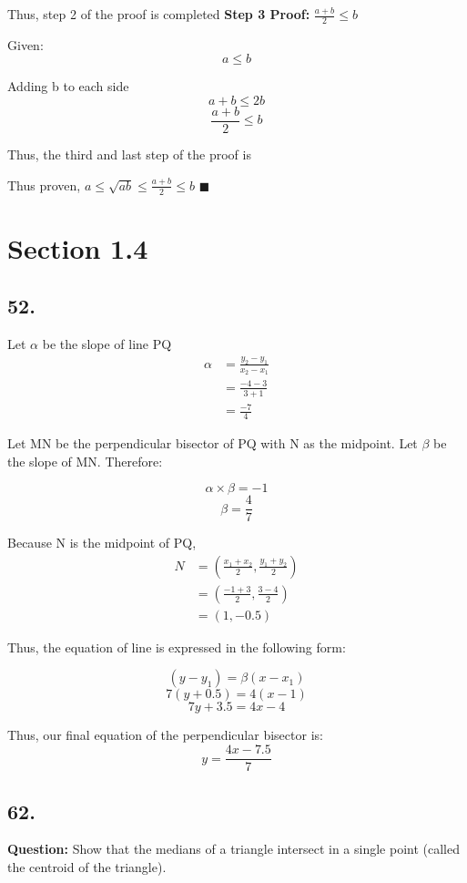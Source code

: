 \documentclass[12pt, a4paper]{article}
\newcommand{\qed}[0]{$\blacksquare$}
\begin{document}
Thus, step 2 of the proof is completed
\bigbreak
\textbf{Step 3 Proof:} $\frac{a+b}{2} \leq b$
\bigbreak

Given:
\[
a \leq b
\]

Adding b to each side
\[
a+b \leq 2b
\]
\[
\frac{a+b}{2} \leq b
\]

Thus, the third and last step of the proof is 

Thus proven, $a \leq \sqrt{ab} \leq \frac{a+b}{2} \leq b$ \qed
\newpage

\section*{Section 1.4}
\subsection*{52.}\bigbreak

Let $\alpha$ be the slope of line PQ
\begin{align}
    \alpha &= \frac{y_2 - y_1}{x_2-x_1}\\
    &= \frac{-4-3}{3+1}\\
    &= \frac{-7}{4}
\end{align}

\noindent Let MN be the perpendicular bisector of PQ with N as the midpoint. Let $\beta$ be the slope of MN. Therefore:

\[
\alpha \times \beta = -1
\]
\[
\beta = \frac{4}{7}
\]

\noindent Because N is the midpoint of PQ,
\begin{align}
    N &= \left(\frac{x_1 + x_2}{2}, \frac{y_1+y_2}{2}\right)\\
    &= \left(\frac{-1+3}{2}, \frac{3-4}{2}\right)\\
    &= \left(1,-0.5\right)
\end{align}

\noindent Thus, the equation of line is expressed in the following form:

\[
(y-y_1) = \beta(x-x_1)
\]
\[
7(y+0.5) = 4(x-1)
\]
\[
7y + 3.5 = 4x-4
\]

\noindent Thus, our final equation of the perpendicular bisector is:
\[
y = \frac{4x-7.5}{7}
\]\bigbreak


\subsection*{62.}\bigbreak

\textbf{Question:} Show that the medians of a triangle intersect in a single point (called the centroid of the triangle).
\end{document}
